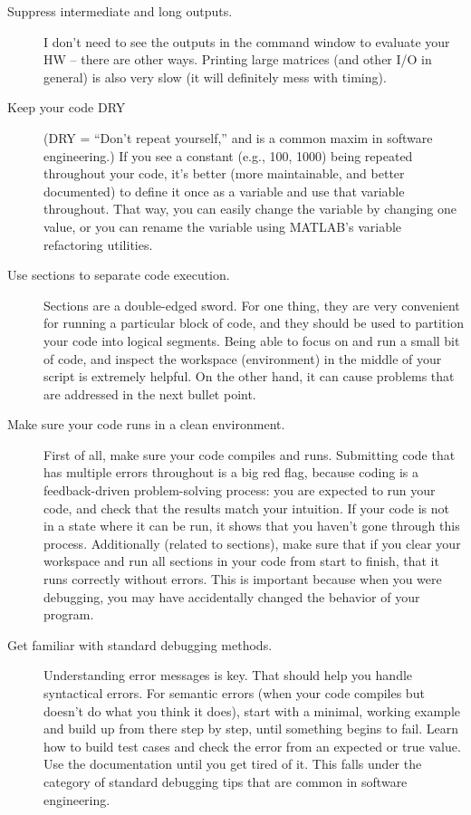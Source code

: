 \documentclass{article}
\begin{document}
\begin{description}
\item[Suppress intermediate and long outputs.] I don't need to see the outputs in the command window to evaluate your HW -- there are other ways. Printing large matrices (and other I/O in general) is also very slow (it will definitely mess with timing).
\item[Keep your code DRY] (DRY = ``Don't repeat yourself,'' and is a common maxim in software engineering.) If you see a constant (e.g., 100, 1000) being repeated throughout your code, it's better (more maintainable, and better documented) to define it once as a variable and use that variable throughout. That way, you can easily change the variable by changing one value, or you can rename the variable using MATLAB's variable refactoring utilities.
\item[Use sections to separate code execution.] Sections are a double-edged sword. For one thing, they are very convenient for running a particular block of code, and they should be used to partition your code into logical segments. Being able to focus on and run a small bit of code, and inspect the workspace (environment) in the middle of your script is extremely helpful. On the other hand, it can cause problems that are addressed in the next bullet point.
\item[Make sure your code runs in a clean environment.] First of all, make sure your code compiles and runs. Submitting code that has multiple errors throughout is a big red flag, because coding is a feedback-driven problem-solving process: you are expected to run your code, and check that the results match your intuition. If your code is not in a state where it can be run, it shows that you haven't gone through this process. Additionally (related to sections), make sure that if you clear your workspace and run all sections in your code from start to finish, that it runs correctly without errors. This is important because when you were debugging, you may have accidentally changed the behavior of your program.
\item[Get familiar with standard debugging methods.] Understanding error messages is key. That should help you handle syntactical errors. For semantic errors (when your code compiles but doesn't do what you think it does), start with a minimal, working example and build up from there step by step, until something begins to fail. Learn how to build test cases and check the error from an expected or true value. Use the documentation until you get tired of it. This falls under the category of standard debugging tips that are common in software engineering.
\end{description}
\end{document}
